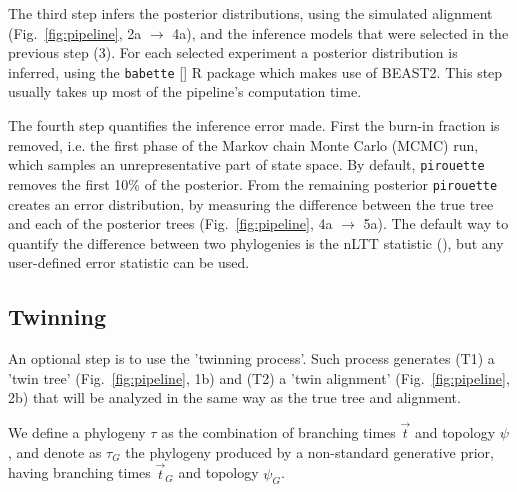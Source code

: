 The third step infers the posterior distributions,
using the simulated alignment (Fig.~\ref{fig:pipeline}, 2a $\rightarrow$ 4a),
and the inference models that were selected in the previous step (3). 
For each selected experiment a posterior distribution is inferred, using the 
\verb;babette; [\cite{bilderbeek2018babette}] R package which makes use of BEAST2. 
This step usually takes up most of the pipeline's computation time.

The fourth step quantifies the inference error made. 
First the burn-in fraction is removed, i.e. the first phase of the 
Markov chain Monte Carlo (MCMC) run,
which samples an unrepresentative part of state space. 
By default, \verb;pirouette; 
removes the first 10\% of the posterior.
From the remaining posterior \verb;pirouette; 
creates an error distribution, by measuring the difference
between the true tree and each of the posterior 
trees (Fig.~\ref{fig:pipeline}, 4a $\rightarrow$ 5a).
The default way to quantify the difference between two phylogenies
is the nLTT statistic (\cite{janzen2015approximate}), but any 
user-defined error statistic can be used.

\subsection{Twinning}\label{subsec:twinning}

An optional step is to use the 'twinning process'. Such process generates (T1) a 'twin tree' (Fig.~\ref{fig:pipeline}, 1b) and (T2) a 'twin alignment' (Fig.~\ref{fig:pipeline}, 2b)
that will be analyzed in the same way as the true tree and alignment.

We define a phylogeny $\tau$ as the combination of
branching times $\Vec{t}$ and topology $\psi$, and denote as $\tau_{\mathit{G}}$ the phylogeny produced by a non-standard generative prior, having branching times $\Vec{t}_{\mathit{G}}$ and 
topology $\psi_{\mathit{G}}$.

